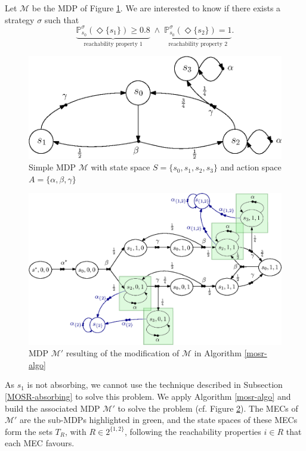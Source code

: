 \begin{example}
Let $\mathcal{M}$ be the MDP of Figure \ref{molp-mdp}. We are interested to know if there exists a strategy $\sigma$ such that
\[
  \underbrace{\mathbb{P}_{s_0}^{\sigma}(\Diamond \{s_1\}) \geq 0.8}_{\text{reachability property $1$}} \; \wedge \; \underbrace{\mathbb{P}_{s_0}^\sigma (\Diamond \{s_2\}) = 1}_{\text{reachability property $2$}}.
\]
\begin{figure}[h!]
  \centering
  \captionsetup{justification=centering}
  \includegraphics[width=0.7\linewidth]{resources/MOLP-simple-mdp}
  \caption{Simple MDP $\mathcal{M}$ with state space $S = \{s_0, s_1, s_2, s_3\}$ and action space $A = \{\alpha, \beta, \gamma\}$}
  \label{molp-mdp}
\end{figure}
\begin{figure}[h!]
  \centering
  \captionsetup{justification=centering}
  \includegraphics[width=0.9\linewidth]{resources/MOLP-product}
  \caption{MDP $\mathcal{M}'$ resulting of the modification of $\mathcal{M}$ in Algorithm \ref{mosr-algo}}
  \label{molp-mdp2}
\end{figure}
As $s_1$ is not absorbing, we cannot use the technique described in Subsection \ref{MOSR-absorbing} to solve this \MOSR{} problem.
We apply Algorithm \ref{mosr-algo} and build the associated MDP $\mathcal{M}'$ to solve the problem (cf. Figure \ref{molp-mdp2}).
The MECs of $\mathcal{M}'$ are the sub-MDPs highlighted in green, and the state spaces of these MECs form the sets $T_R$, with $R \in 2^{\{1, 2\}}$, following the reachability properties $i \in R$ that each MEC favours.

\end{example}
